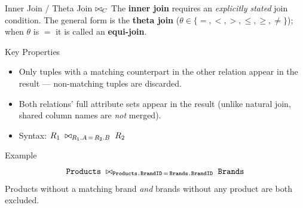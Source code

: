 \begin{frame}{Inner Join / Theta Join $\bowtie_C$}
  The \textbf{inner join} requires an \emph{explicitly stated} join condition.
  The general form is the \textbf{theta join} ($\theta \in \{=, <, >, \leq,
  \geq, \neq\}$); when $\theta$ is $=$ it is called an \textbf{equi-join}.

  \begin{block}{Key Properties}
    \begin{itemize}
      \item Only tuples with a matching counterpart in the other relation
            appear in the result --- non-matching tuples are discarded.
      \item Both relations' full attribute sets appear in the result
            (unlike natural join, shared column names are \emph{not} merged).
      \item Syntax: $R_1 \;\bowtie_{R_1.A \,=\, R_2.B}\; R_2$
    \end{itemize}
  \end{block}

  \begin{examples}{Example}
    \[
      \texttt{Products} \;\bowtie_{\texttt{Products.BrandID}\,=\,\texttt{Brands.BrandID}}\; \texttt{Brands}
    \]
    Products without a matching brand \emph{and} brands without any product
    are both excluded.
  \end{examples}
\end{frame}

